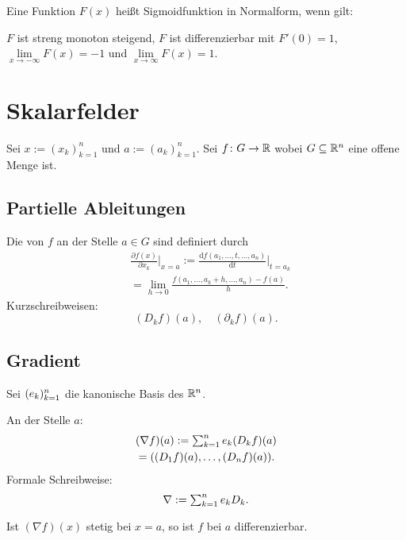 \noindent
Eine Funktion $F(x)$ heißt Sigmoidfunktion in Normalform, wenn gilt:
\begin{itemize}
\bitem $F$ ist streng monoton steigend,
\bitem $F$ ist differenzierbar mit $F'(0)=1$,
\bitem $\lim\limits_{x\to -\infty}F(x)=-1$ und $\lim\limits_{x\to\infty}F(x)=1$.
\end{itemize}


\clearpage
\section{Skalarfelder}
Sei $x:=(x_k)_{k=1}^n$ und $a:=(a_k)_{k=1}^n$. Sei $f\colon G\to\mathbb R$
wobei $G\subseteq\mathbb R^n$ eine offene Menge ist.
\subsection{Partielle Ableitungen}
\begin{definition}\mbox{}\newline
Die 
von $f$ an der Stelle $a\in G$ sind definiert durch
\begin{equation}
\begin{split}
&\frac{\partial f(x)}{\partial x_k}\bigg|_{x=a}
:= \frac{\mathrm df(a_1,\ldots,t,\ldots,a_n)}{\mathrm dt}\bigg|_{t=a_k}\\
&= \lim_{h\to 0}\frac{f(a_1,\ldots,a_k+h,\ldots,a_n)-f(a)}{h}.
\end{split}
\end{equation}
Kurzschreibweisen:
\begin{equation}
(D_k f)(a),\quad (\partial_k f)(a).
\end{equation}
\end{definition}
\subsection{Gradient}
Sei $(e_k)_{k=1}^n$ die kanonische Basis des $\mathbb R^n$.
\begin{definition}[Gradient]\mbox{}\newline
An der Stelle $a$:
\begin{equation}
\begin{split}
&(\nabla f)(a) := \textstyle\sum_{k=1}^n e_k (D_k f)(a)\\
&= ((D_1 f)(a),\ldots,(D_n f)(a)).
\end{split}
\end{equation}
Formale Schreibweise:
\begin{equation}
\nabla := \textstyle\sum_{k=1}^n e_k D_k.
\end{equation}
\end{definition}
\noindent
Ist $(\nabla f)(x)$ stetig bei $x=a$, so
ist $f$ bei $a$ differenzierbar.

